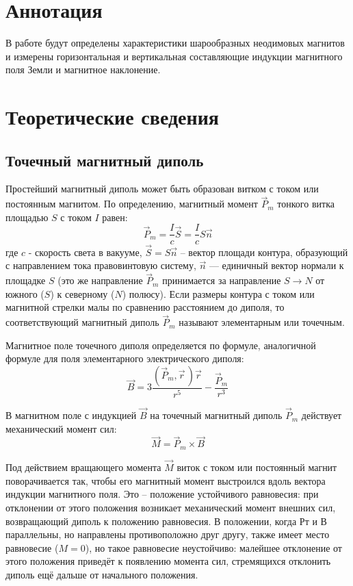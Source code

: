  


\section{Аннотация}
В работе будут определены характеристики шарообразных неодимовых магнитов и
измерены горизонтальная и вертикальная составляющие индукции магнитного поля Земли и магнитное наклонение.
\section{Теоретические сведения}
\subsection*{Точечный магнитный диполь}
Простейший магнитный диполь может быть образован витком с током или постоянным магнитом. По
определению, магнитный момент $\vec P_m$ тонкого витка площадью $S$ с током $I$ равен:
\[
    \vec P_m = \frac{I}{c}\vec S = \frac{I}{c}S\vec n
\]
где $c$ - скорость света в вакууме, $\vec S = S\vec n$ -- вектор площади контура, образующий с
направлением тока правовинтовую систему, $\vec n$ — единичный вектор нормали к площадке $S$ (это же
направление $\vec P_m$ принимается за направление $S \to N$ от южного ($S$) к северному ($N$)
полюсу). Если размеры контура с током или магнитной стрелки малы по сравнению расстоянием до диполя,
то соответствующий магнитный диполь $\vec P_m$ называют элементарным или точечным.

Магнитное поле точечного диполя определяется по формуле, аналогичной формуле для поля элементарного
электрического диполя:
\begin{equation}
    \vec B = 3\frac{(\vec P_m, \vec r \,)\vec r}{r^5} - \frac{\vec P_m}{r^3}
\end{equation}

В магнитном поле с индукцией $\vec B$ на точечный магнитный диполь $\vec P_m$ действует механический момент сил:
\begin{equation}
    \vec M = \vec P_m \times \vec B
\end{equation}

Под действием вращающего момента $\vec M$ виток с током или постоянный магнит поворачивается так, чтобы его
магнитный момент выстроился вдоль вектора индукции магнитного поля. Это -- положение устойчивого
равновесия: при отклонении от этого положения возникает механический момент внешних сил,
возвращающий диполь к положению равновесия. В положении, когда Рт и В параллельны, но направлены
противоположно друг другу, также имеет место равновесие ($M = 0$), но такое равновесие неустойчиво:
малейшее отклонение от этого положения приведёт к появлению момента сил, стремящихся отклонить
диполь ещё дальше от начального положения.

